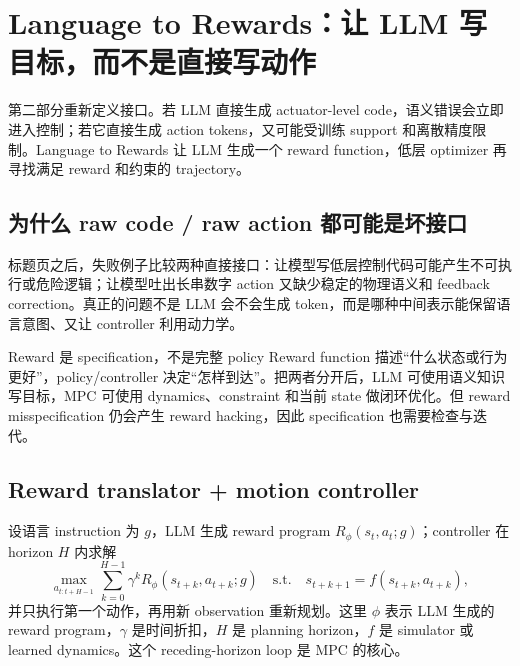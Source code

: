 \section{Language to Rewards：让 LLM 写目标，而不是直接写动作}

第二部分重新定义接口。若 LLM 直接生成 actuator-level code，语义错误会立即进入控制；若它直接生成 action tokens，又可能受训练 support 和离散精度限制。Language to Rewards 让 LLM 生成一个 reward function，低层 optimizer 再寻找满足 reward 和约束的 trajectory。

\subsection{为什么 raw code / raw action 都可能是坏接口}

标题页之后，失败例子比较两种直接接口：让模型写低层控制代码可能产生不可执行或危险逻辑；让模型吐出长串数字 action 又缺少稳定的物理语义和 feedback correction。真正的问题不是 LLM 会不会生成 token，而是哪种中间表示能保留语言意图、又让 controller 利用动力学。




\begin{importantbox}{Reward 是 specification，不是完整 policy}
Reward function 描述“什么状态或行为更好”，policy/controller 决定“怎样到达”。把两者分开后，LLM 可使用语义知识写目标，MPC 可使用 dynamics、constraint 和当前 state 做闭环优化。但 reward misspecification 仍会产生 reward hacking，因此 specification 也需要检查与迭代。
\end{importantbox}

\subsection{Reward translator + motion controller}

设语言 instruction 为 $g$，LLM 生成 reward program $R_\phi(s_t,a_t;g)$；controller 在 horizon $H$ 内求解
$$
\max_{a_{t:t+H-1}}
\sum_{k=0}^{H-1}\gamma^k R_\phi(s_{t+k},a_{t+k};g)
\quad\text{s.t.}\quad
s_{t+k+1}=f(s_{t+k},a_{t+k}),
$$
并只执行第一个动作，再用新 observation 重新规划。这里 $\phi$ 表示 LLM 生成的 reward program，$\gamma$ 是时间折扣，$H$ 是 planning horizon，$f$ 是 simulator 或 learned dynamics。这个 receding-horizon loop 是 MPC 的核心。

